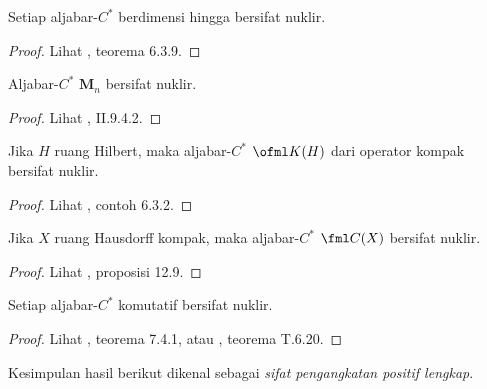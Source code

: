 \begin{exam}\label{0058513} Setiap aljabar-$C^*$ berdimensi hingga bersifat nuklir.
\end{exam}

\begin{proof} Lihat \cite{Murphy:1990}, teorema 6.3.9.  \ns \end{proof}

\begin{exam}\label{0058514} Aljabar-$C^*$ $\mathbf M_n$
bersifat nuklir.
\end{exam}
\begin{proof} Lihat \cite{Blackadar:2006}, II.9.4.2.  \ns \end{proof}

\begin{exam}\label{0058515} Jika $H$ ruang Hilbert,
maka aljabar-$C^*$ $\ofml K(H)$ dari operator kompak bersifat nuklir.
\end{exam}
\begin{proof} Lihat \cite{Murphy:1990}, contoh 6.3.2.  \ns \end{proof}

\begin{exam}\label{0058517} Jika $X$ ruang Hausdorff kompak, maka aljabar-$C^*$
$\fml C(X)$ bersifat nuklir.
\end{exam}

\begin{proof} Lihat \cite{Paulsen:2002}, proposisi 12.9.  \ns \end{proof}

\begin{exam}\label{0058519} Setiap aljabar-$C^*$ komutatif bersifat nuklir.
\end{exam}

\begin{proof} Lihat \cite{Fillmore:1996}, teorema 7.4.1, atau \cite{Wegge-Olsen:1993}, teorema
T.6.20. \ns
\end{proof}

Kesimpulan hasil berikut dikenal sebagai
\emph{sifat pengangkatan positif lengkap}.

